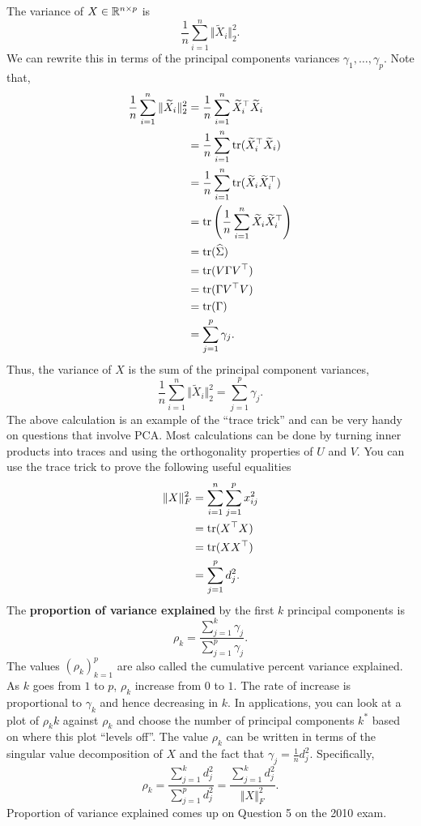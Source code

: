 The variance of $X \in \mathbb{R}^{n \times p}$ is 
\[\frac{1}{n}\sum_{i=1}^n \Vert \widetilde{X}_i \Vert_2^2. \]
We can rewrite this in terms of the principal components variances $\gamma_1,\ldots, \gamma_p$. Note that,
\begin{align*}
    \frac{1}{n}\sum_{i=1}^n \Vert \widetilde{X}_i \Vert_2^2&=\frac{1}{n}\sum_{i=1}^n \widetilde{X}_i^\top \widetilde{X}_i \\
    &=\frac{1}{n} \sum_{i=1}^n \operatorname{tr}(\widetilde{X}_i^\top \widetilde{X}_i)\\
    &=\frac{1}{n}\sum_{i=1}^n \operatorname{tr}(\widetilde{X}_i\widetilde{X}_i^\top)\\
    &=\operatorname{tr}\left(\frac{1}{n}\sum_{i=1}^n \widetilde{X}_i\widetilde{X}_i^\top \right)\\
    &=\operatorname{tr}(\widehat{\Sigma})\\
    &=\operatorname{tr}(V\Gamma V^\top)\\
    &=\operatorname{tr}(\Gamma V^\top V)\\
    &=\operatorname{tr}(\Gamma)\\
    &=\sum_{j=1}^p \gamma_j.
\end{align*}
Thus, the variance of $X$ is the sum of the principal component variances,
\[\frac{1}{n}\sum_{i=1}^n \Vert \widetilde{X}_i \Vert_2^2 = \sum_{j=1}^p \gamma_j. \]
The above calculation is an example of the ``trace trick'' and can be very handy on questions that involve PCA. Most calculations can be done by turning inner products into traces and using the orthogonality properties of $U$ and $V$. You can use the trace trick to prove the following useful equalities
\begin{align*}
    \Vert X \Vert_F^2 &=\sum_{i=1}^n\sum_{j=1}^p x_{ij}^2\\
    &=\operatorname{tr}(X^\top X)\\
    &=\operatorname{tr}(XX^\top)\\
    &=\sum_{j=1}^p d_j^2.
\end{align*}
The \textbf{proportion of variance explained} by the first $k$ principal components is 
\[\rho_k = \frac{\sum_{j=1}^k \gamma_j}{\sum_{j=1}^p \gamma_j}. \]
The values $(\rho_k)_{k=1}^p$ are also called the cumulative percent variance explained. As $k$ goes from $1$ to $p$, $\rho_k$ increase from $0$ to $1$. The rate of increase is proportional to $\gamma_k$ and hence decreasing in $k$. In applications, you can look at a plot of $\rho_kk$ against $\rho_k$ and choose the number of principal components $k^*$ based on where this plot ``levels off''. The value $\rho_k$ can be written in terms of the singular value decomposition of $X$ and the fact that $\gamma_j = \frac{1}{n}d_j^2$. Specifically,
\[\rho_k = \frac{\sum_{j=1}^k d_j^2}{\sum_{j=1}^p d_j^2} = \frac{\sum_{j=1}^k d_j^2}{\Vert X \Vert_F^2}. \]
Proportion of variance explained comes up on Question 5 on the 2010 exam.

